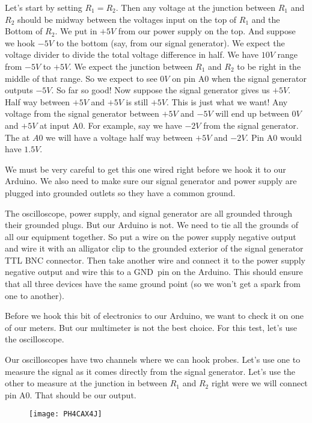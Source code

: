 Let's start by setting $R_{1}=R_{2}.$ Then any voltage at the junction
between $R_{1}$ and $R_{2}$ should be midway between the voltages input on
the top of $R_{1}$ and the Bottom of $R_{2}.$ We put in $+5\unit{V}$ from
our power supply on the top. And suppose we hook $-5\unit{V}$ to the bottom
(say, from our signal generator). We expect the voltage divider to divide
the total voltage difference in half. We have $10\unit{V}$ range from $-5%
\unit{V}$ to $+5\unit{V}$. We expect the junction between $R_{1}$ and $R_{2}$
to be right in the middle of that range. So we expect to see $0\unit{V}$ on
pin A0 when the signal generator outputs $-5\unit{V}.$ So far so good! Now
suppose the signal generator gives us $+5\unit{V}.$ Half way between $+5%
\unit{V}$ and $+5\unit{V}$ is still $+5\unit{V}$. This is just what we want!
Any voltage from the signal generator between $+5\unit{V}$ and $-5\unit{V}$
will end up between $0\unit{V}$ and $+5\unit{V}$ at input A0. For example,
say we have $-2\unit{V}$ from the signal generator. The at $A0$ we will have
a voltage half way between $+5\unit{V}$ and $-2\unit{V}.$ Pin A0 would have $%
1.5\unit{V}.$

We must be very careful to get this one wired right before we hook it to our
Arduino. We also need to make sure our signal generator and power supply are
plugged into grounded outlets so they have a common ground.

The oscilloscope, power supply, and signal generator are all grounded
through their grounded plugs. But our Arduino is not. We need to tie all the
grounds of all our equipment together. So put a wire on the power supply
negative output and wire it with an alligator clip to the grounded exterior
of the signal generator TTL BNC connector. Then take another wire and
connect it to the power supply negative output and wire this to a GND\ pin
on the Arduino. This should ensure that all three devices have the same
ground point (so we won't get a spark from one to another).

Before we hook this bit of electronics to our Arduino, we want to check it
on one of our meters. But our multimeter is not the best choice. For this
test, let's use the oscilloscope.

Our oscilloscopes have two channels where we can hook probes. Let's use one
to measure the signal as it comes directly from the signal generator. Let's
use the other to measure at the junction in between $R_{1}$ and $R_{2}$
right were we will connect pin A0. That should be our output. \begin{figure}[h!]
\texttt{[image: PH4CAX4J]}
\end{figure}

